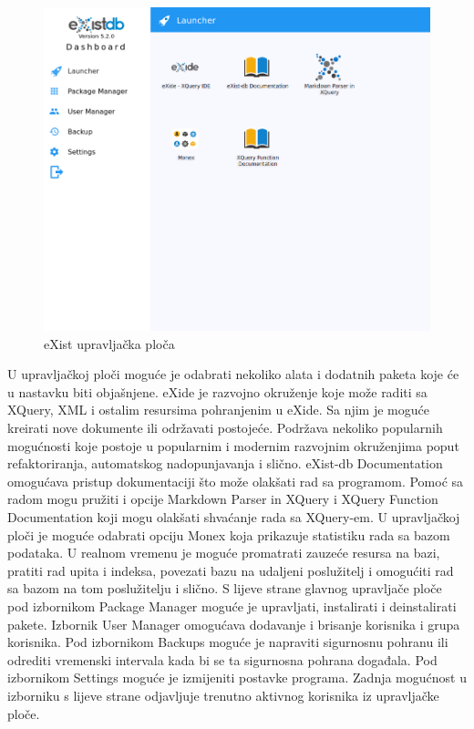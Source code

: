 \documentclass{foi}
\begin{document}
\begin{figure}[h!]
    \centering
    \includegraphics[width=1\textwidth]{slike/exist-dashboard.png}
    \caption{eXist upravljačka ploča}
    \label{exist-dashboard}
\end{figure}

U upravljačkoj ploči moguće je odabrati nekoliko alata i dodatnih paketa koje će u nastavku biti objašnjene. eXide je razvojno okruženje koje može raditi sa XQuery, XML i ostalim resursima pohranjenim u eXide. Sa njim je moguće kreirati nove dokumente ili održavati postojeće. Podržava nekoliko popularnih mogućnosti koje postoje u popularnim i modernim razvojnim okruženjima poput refaktoriranja, automatskog nadopunjavanja i slično. eXist-db Documentation omogućava pristup dokumentaciji što može olakšati rad sa programom. Pomoć sa radom mogu pružiti i opcije Markdown Parser in XQuery i XQuery Function Documentation koji mogu olakšati shvaćanje rada sa XQuery-em. U upravljačkoj ploči je moguće odabrati opciju Monex koja prikazuje statistiku rada sa bazom podataka. U realnom vremenu je moguće promatrati zauzeće resursa na bazi, pratiti rad upita i indeksa, povezati bazu na udaljeni poslužitelj i omogućiti rad sa bazom na tom poslužitelju i slično. S lijeve strane glavnog upravljače ploče pod izbornikom Package Manager moguće je upravljati, instalirati i deinstalirati pakete. Izbornik User Manager omogućava dodavanje i brisanje korisnika i grupa korisnika. Pod izbornikom Backups moguće je napraviti sigurnosnu pohranu ili odrediti vremenski intervala kada bi se ta sigurnosna pohrana događala. Pod izbornikom Settings moguće je izmijeniti postavke programa. Zadnja mogućnost u izborniku s lijeve strane odjavljuje trenutno aktivnog korisnika iz upravljačke ploče.
\end{document}
